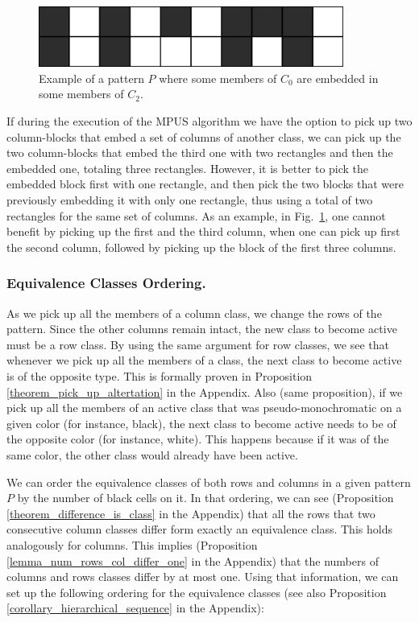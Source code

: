 \begin{figure}[h]
\centering
\includegraphics[width=10cm]{embedment_example}
\caption{Example of a pattern $P$ where some members of $C_{0}$ are embedded in some members of $C_{2}$.}
\label{fig:embedment_example}
\end{figure}

If during the execution of the MPUS algorithm we have the option to pick up two
column-blocks that embed a set of columns of another class,
 we can pick up the two column-blocks that embed the third one with
 two rectangles and then the embedded one, totaling three rectangles.
 However, it is better to pick the embedded block first with one rectangle,
and then pick the two blocks that were previously embedding it with only one
rectangle, thus using a total of two rectangles for the same set of columns.
As an example, in Fig.~\ref{fig:embedment_example}, one cannot benefit
by picking up the first and the third column, when one can pick up
first the second column, followed by picking up the block of the first three
columns.

\subsubsection{Equivalence Classes Ordering.}
\label{ss_ordering}
As we pick up all the members of a column class, we change the rows of the pattern. Since the other columns remain intact, the new class to become active must be a row class. By using the same argument for row classes, we see that whenever we pick up all the members of a class, the next class to become active is of the opposite type.  This is formally proven in Proposition
\ref{theorem_pick_up_altertation} in the Appendix.
Also (same proposition), if we pick up all the members of an active class that was pseudo-monochromatic on a given color (for instance, black), the next class to become active needs to be of the opposite color (for instance, white). This happens because if it was of the same color, the other class would already have been active.

We can order the equivalence classes of both rows and columns in a given
 pattern $P$ by the number of black cells on it. In that ordering,
we can see (Proposition \ref{theorem_difference_is_class} in the Appendix)
that all the rows that two consecutive column classes differ
 form exactly an equivalence class. This holds analogously for columns.
This implies (Proposition \ref{lemma_num_rows_col_differ_one} in the Appendix)
that the numbers of columns and rows classes differ
by at most one.  Using that information,
 we can set up the following ordering for the equivalence classes
(see also Proposition \ref{corollary_hierarchical_sequence} in the Appendix):

